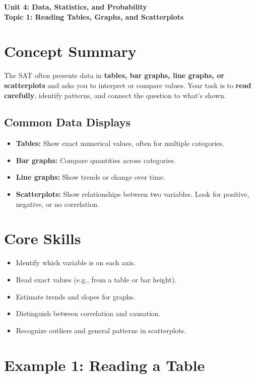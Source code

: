\documentclass[12pt]{article}
\begin{document}
\begin{center}
    \LARGE \textbf{Unit 4: Data, Statistics, and Probability} \\[6pt]
    \Large \textbf{Topic 1: Reading Tables, Graphs, and Scatterplots}
\end{center}

\vspace{1em}

\section*{Concept Summary}

The SAT often presents data in \textbf{tables, bar graphs, line graphs, or scatterplots} and asks you to interpret or compare values.  
Your task is to \textbf{read carefully}, identify patterns, and connect the question to what’s shown.

\subsection*{Common Data Displays}
\begin{itemize}
  \item \textbf{Tables:} Show exact numerical values, often for multiple categories.
  \item \textbf{Bar graphs:} Compare quantities across categories.
  \item \textbf{Line graphs:} Show trends or change over time.
  \item \textbf{Scatterplots:} Show relationships between two variables. Look for positive, negative, or no correlation.
\end{itemize}

\section*{Core Skills}
\begin{itemize}
  \item Identify which variable is on each axis.
  \item Read exact values (e.g., from a table or bar height).
  \item Estimate trends and slopes for graphs.
  \item Distinguish between correlation and causation.
  \item Recognize outliers and general patterns in scatterplots.
\end{itemize}

\section*{Example 1: Reading a Table}
\end{document}
